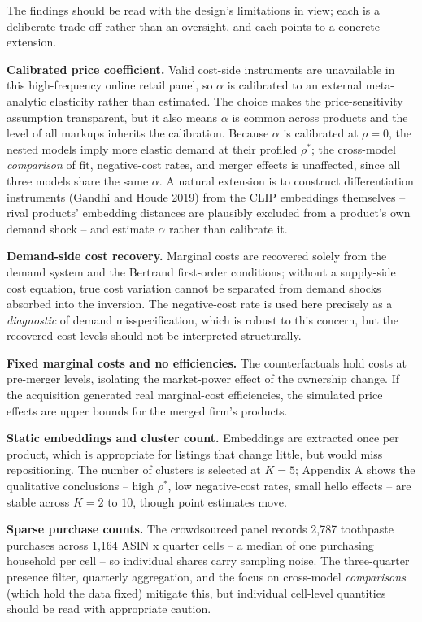 The findings should be read with the design's limitations in view; each
is a deliberate trade-off rather than an oversight, and each points to a
concrete extension.

\textbf{Calibrated price coefficient.} Valid cost-side instruments are
unavailable in this high-frequency online retail panel, so \(\alpha\) is
calibrated to an external meta-analytic elasticity rather than
estimated. The choice makes the price-sensitivity assumption
transparent, but it also means \(\alpha\) is common across products and
the level of all markups inherits the calibration. Because \(\alpha\) is
calibrated at \(\rho = 0\), the nested models imply more elastic demand
at their profiled \(\rho^{*}\); the cross-model \emph{comparison} of
fit, negative-cost rates, and merger effects is unaffected, since all
three models share the same \(\alpha\). A natural extension is to
construct differentiation instruments (Gandhi and Houde 2019) from the
CLIP embeddings themselves -- rival products' embedding distances are
plausibly excluded from a product's own demand shock -- and estimate
\(\alpha\) rather than calibrate it.

\textbf{Demand-side cost recovery.} Marginal costs are recovered solely
from the demand system and the Bertrand first-order conditions; without
a supply-side cost equation, true cost variation cannot be separated
from demand shocks absorbed into the inversion. The negative-cost rate
is used here precisely as a \emph{diagnostic} of demand
misspecification, which is robust to this concern, but the recovered
cost levels should not be interpreted structurally.

\textbf{Fixed marginal costs and no efficiencies.} The counterfactuals
hold costs at pre-merger levels, isolating the market-power effect of
the ownership change. If the acquisition generated real marginal-cost
efficiencies, the simulated price effects are upper bounds for the
merged firm's products.

\textbf{Static embeddings and cluster count.} Embeddings are extracted
once per product, which is appropriate for listings that change little,
but would miss repositioning. The number of clusters is selected at
\(K=5\); Appendix A shows the qualitative conclusions -- high
\(\rho^{*}\), low negative-cost rates, small hello effects -- are stable
across \(K = 2\) to \(10\), though point estimates move.

\textbf{Sparse purchase counts.} The crowdsourced panel records 2,787
toothpaste purchases across 1,164 ASIN x quarter cells -- a median of
one purchasing household per cell -- so individual shares carry sampling
noise. The three-quarter presence filter, quarterly aggregation, and the
focus on cross-model \emph{comparisons} (which hold the data fixed)
mitigate this, but individual cell-level quantities should be read with
appropriate caution.

